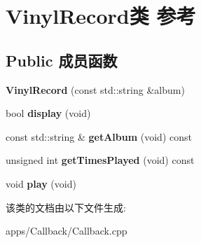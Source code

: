 \hypertarget{class_vinyl_record}{\section{Vinyl\+Record类 参考}
\label{class_vinyl_record}
}
\subsection*{Public 成员函数}
\begin{DoxyCompactItemize}
\item 
\hypertarget{class_vinyl_record_a9646da94093b003a6f73ea65b2f9ff86}{{\bfseries Vinyl\+Record} (const std\+::string \&album)}\label{class_vinyl_record_a9646da94093b003a6f73ea65b2f9ff86}

\item 
\hypertarget{class_vinyl_record_a49d248610e39554458159f1d5f26fb6d}{bool {\bfseries display} (void)}\label{class_vinyl_record_a49d248610e39554458159f1d5f26fb6d}

\item 
\hypertarget{class_vinyl_record_a4067f80497875cf5737508b307bdbf63}{const std\+::string \& {\bfseries get\+Album} (void) const }\label{class_vinyl_record_a4067f80497875cf5737508b307bdbf63}

\item 
\hypertarget{class_vinyl_record_a4dceb92042a4f638e1ae9f833f7f55fe}{unsigned int {\bfseries get\+Times\+Played} (void) const }\label{class_vinyl_record_a4dceb92042a4f638e1ae9f833f7f55fe}

\item 
\hypertarget{class_vinyl_record_aca6415a1557e3a9e8d02967d16fdf2e4}{void {\bfseries play} (void)}\label{class_vinyl_record_aca6415a1557e3a9e8d02967d16fdf2e4}

\end{DoxyCompactItemize}


该类的文档由以下文件生成\+:\begin{DoxyCompactItemize}
\item 
apps/\+Callback/Callback.\+cpp\end{DoxyCompactItemize}
